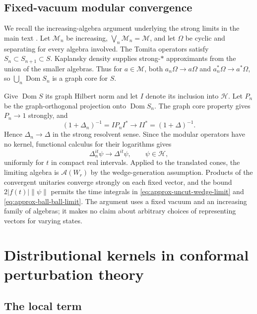 \documentclass[a4paper,11pt]{article}
\theoremstyle{definition}
\begin{document}
\subsection{Fixed-vacuum modular convergence}

We recall the increasing-algebra argument underlying the strong limits in the
main text \cite{revolutionizing,takesaki2}. Let $\mathcal M_n$ be increasing,
$\bigvee_n\mathcal M_n=\mathcal M$, and let $\Omega$ be cyclic and separating
for every algebra involved. The Tomita operators satisfy $S_n\subset S_{n+1}
\subset S$. Kaplansky density supplies strong-$*$ approximants from the union
of the smaller algebras. Thus for $a\in\mathcal M$, both $a_n\Omega\to a\Omega$
and $a_n^*\Omega\to a^*\Omega$, so $\bigcup_n\operatorname{Dom}S_n$ is a graph
core for $S$.

Give $\operatorname{Dom}S$ its graph Hilbert norm and let $I$ denote its inclusion
into $\mathcal H$. Let $P_n$ be the graph-orthogonal projection onto
$\operatorname{Dom}S_n$. The graph core property gives $P_n\to1$ strongly, and
\begin{equation}
 (1+\Delta_n)^{-1}=IP_nI^*\longrightarrow II^*=(1+\Delta)^{-1}.
 \label{eq:app-modular-resolvent-limit}
\end{equation}
Hence $\Delta_n\to\Delta$ in the strong resolvent sense. Since the modular
operators have no kernel, functional calculus for their logarithms gives
\begin{equation}
 \Delta_n^{it}\psi\longrightarrow\Delta^{it}\psi,
 \qquad \psi\in\mathcal H,
 \label{eq:app-modular-unitary-limit}
\end{equation}
uniformly for $t$ in compact real intervals. Applied to the translated cones,
the limiting algebra is $\mathcal A(W_r)$ by the wedge-generation assumption.
Products of the convergent unitaries converge strongly on each fixed vector,
and the bound $2|f(t)|\|\psi\|$ permits the time integrals in
\eqref{eq:approx-uncut-wedge-limit} and \eqref{eq:approx-ball-ball-limit}.
The argument uses a fixed vacuum and an increasing family of algebras; it makes
no claim about arbitrary choices of representing vectors for varying states.

\section{Distributional kernels in conformal perturbation theory}\label{app:cpt-kernels}

\subsection{The local term}
\end{document}
